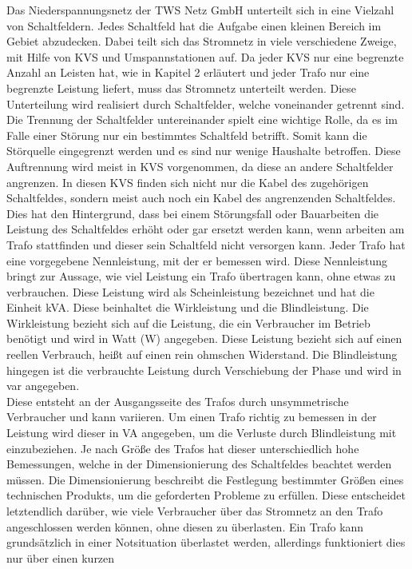 Das Niederspannungsnetz der TWS Netz GmbH unterteilt sich in eine Vielzahl von Schaltfeldern. Jedes Schaltfeld hat die Aufgabe einen kleinen Bereich im Gebiet 
abzudecken. Dabei teilt sich das Stromnetz in viele verschiedene Zweige, mit Hilfe von KVS und Umspannstationen auf. Da jeder KVS nur eine begrenzte Anzahl an 
Leisten hat, wie in Kapitel 2 erläutert und jeder Trafo nur eine begrenzte Leistung liefert, muss das Stromnetz unterteilt werden. Diese Unterteilung wird 
realisiert durch Schaltfelder, welche voneinander getrennt sind. Die Trennung der Schaltfelder untereinander spielt eine wichtige Rolle, da es im Falle einer 
Störung nur ein bestimmtes Schaltfeld betrifft. Somit kann die Störquelle eingegrenzt werden und es sind nur wenige Haushalte betroffen. Diese Auftrennung 
wird meist in KVS vorgenommen, da diese an andere Schaltfelder angrenzen. In diesen KVS finden sich nicht nur die Kabel des zugehörigen Schaltfeldes, sondern 
meist auch noch ein Kabel des angrenzenden Schaltfeldes. Dies hat den Hintergrund, dass bei einem Störungsfall oder Bauarbeiten die Leistung des Schaltfeldes 
erhöht oder gar ersetzt werden kann, wenn \zB arbeiten am Trafo stattfinden und dieser sein Schaltfeld nicht versorgen kann. Jeder Trafo hat eine vorgegebene
Nennleistung, mit der er bemessen wird. Diese Nennleistung bringt zur Aussage, wie viel Leistung ein Trafo übertragen kann, ohne etwas zu verbrauchen. Diese 
Leistung wird als Scheinleistung bezeichnet und hat die Einheit kVA. Diese beinhaltet die Wirkleistung und die Blindleistung. Die Wirkleistung bezieht sich 
auf die Leistung, die ein Verbraucher im Betrieb benötigt und wird in Watt (W) angegeben. Diese Leistung bezieht sich auf einen reellen Verbrauch, heißt auf 
einen rein ohmschen Widerstand. Die Blindleistung hingegen ist die verbrauchte Leistung durch Verschiebung der Phase und wird in var angegeben. \autocite{Hufschmid.2021} 
\\
Diese entsteht an der Ausgangsseite des Trafos durch unsymmetrische Verbraucher und kann variieren. Um einen Trafo richtig zu bemessen in der Leistung wird 
dieser in VA angegeben, um die Verluste durch Blindleistung mit einzubeziehen. Je nach Größe des Trafos hat dieser unterschiedlich hohe Bemessungen, welche 
in der Dimensionierung des Schaltfeldes beachtet werden müssen. Die Dimensionierung beschreibt die Festlegung bestimmter Größen eines technischen Produkts, 
um die geforderten Probleme zu erfüllen. Diese entscheidet letztendlich darüber, wie viele Verbraucher über das Stromnetz an den Trafo angeschlossen werden 
können, ohne diesen zu überlasten. Ein Trafo kann grundsätzlich in einer Notsituation überlastet werden, allerdings funktioniert dies nur über einen kurzen 
